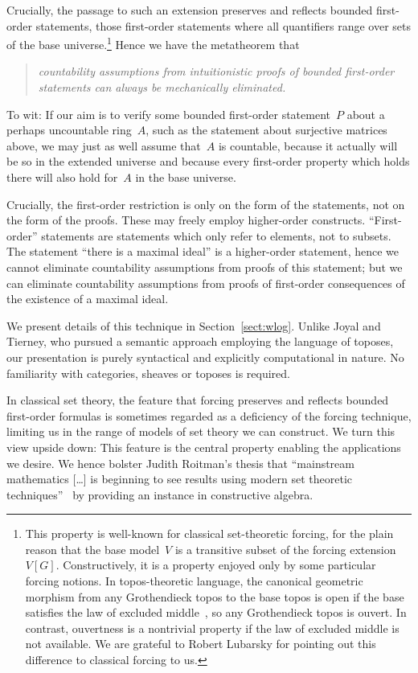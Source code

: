 \documentclass[com,11pt,crcready]{iosart2x}
\theoremstyle{definition}
\theoremstyle{plain}
\theoremstyle{remark}
\renewcommand{\_}{\mathpunct{.}\,}
\begin{document}
Crucially, the passage to such an extension preserves and reflects
bounded first-order statements, those first-order statements where all
quantifiers range over sets of the base universe.\footnote{This property is well-known for classical
set-theoretic forcing, for the plain reason that the base model~$V$ is a
transitive subset of the forcing extension~$V[G]$. Constructively, it is a property enjoyed only by some
particular forcing notions. In topos-theoretic language, the canonical
geometric morphism from any Grothendieck topos to the base topos is open
if the base satisfies the law of excluded middle~\cite[p.~57]{joyal-tierney:grothendieck}, so any Grothendieck topos is
ouvert. In contrast, ouvertness is a nontrivial property if the law of excluded
middle is not available. We are grateful to Robert Lubarsky for pointing out
this difference to classical forcing to us.}
Hence we have the metatheorem that
\begin{quote}\emph{countability
assumptions from intuitionistic proofs of bounded first-order statements can always be
mechanically eliminated.}\end{quote}
To wit: If our aim is to verify some bounded first-order
statement~$P$ about a perhaps uncountable ring~$A$, such as the statement about
surjective matrices above, we may just as well assume that~$A$ is countable,
because it actually will be so in the extended universe and because every
first-order property which holds there will also hold for~$A$ in the base
universe.

Crucially, the first-order restriction is only on the form
of the statements, not on the form of the proofs. These may freely employ higher-order constructs.
``First-order'' statements are statements which only refer to elements, not to
subsets. The statement ``there is a maximal ideal'' is a higher-order
statement, hence we cannot eliminate countability assumptions from proofs of
this statement; but we can eliminate countability assumptions from proofs of
first-order consequences of the existence of a maximal ideal.

We present details of this technique in Section~\ref{sect:wlog}. Unlike
Joyal and Tierney, who pursued a semantic approach employing the language of
toposes, our presentation is purely syntactical and explicitly computational in
nature. No familiarity with categories, sheaves or toposes is required.

In classical set theory, the feature that forcing preserves and reflects
bounded first-order formulas is sometimes regarded as a deficiency of the
forcing technique, limiting us in the range of models of set theory we can
construct. We turn this view upside down: This feature is the central property
enabling the applications we desire. We hence bolster Judith Roitman's thesis
that ``mainstream mathematics [\ldots\!] is beginning to see results using modern
set theoretic techniques''~\cite{roitman:uses} by providing an instance in
constructive algebra.
\end{document}
